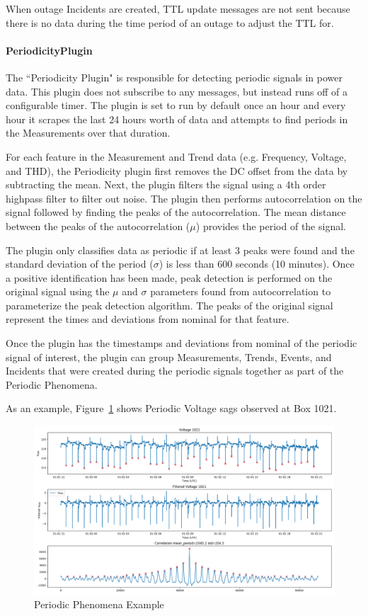 When outage Incidents are created, TTL update messages are not sent because there is no data during the time period of an outage to adjust the TTL for.

\paragraph{PeriodicityPlugin}

The ``Periodicity Plugin" is responsible for detecting periodic signals in power data. This plugin does not subscribe to any messages, but instead runs off of a configurable timer. The plugin is set to run by default once an hour and every hour it scrapes the last 24 hours worth of data and attempts to find periods in the Measurements over that duration.

For each feature in the Measurement and Trend data (e.g. Frequency, Voltage, and THD), the Periodicity plugin first removes the DC offset from the data by subtracting the mean. Next, the plugin filters the signal using a 4th order highpass filter to filter out noise. The plugin then performs autocorrelation on the signal followed by finding the peaks of the autocorrelation. The mean distance between the peaks of the autocorrelation ($\mu$) provides the period of the signal.

The plugin only classifies data as periodic if at least 3 peaks were found and the standard deviation of the period ($\sigma$) is less than 600 seconds (10 minutes). Once a positive identification has been made, peak detection is performed on the original signal using the $\mu$ and $\sigma$ parameters found from autocorrelation to parameterize the peak detection algorithm. The peaks of the original signal represent the times and deviations from nominal for that feature.

Once the plugin has the timestamps and deviations from nominal of the periodic signal of interest, the plugin can group Measurements, Trends, Events, and Incidents that were created during the periodic signals together as part of the Periodic Phenomena.

As an example, Figure~\ref{fig:periodic_example} shows Periodic Voltage sags observed at Box 1021.

\begin{figure}[h]
	\centering
	\includegraphics[width=\linewidth]{figures/periodic_example.png}
	\caption{Periodic Phenomena Example}
	\label{fig:periodic_example}
\end{figure}


